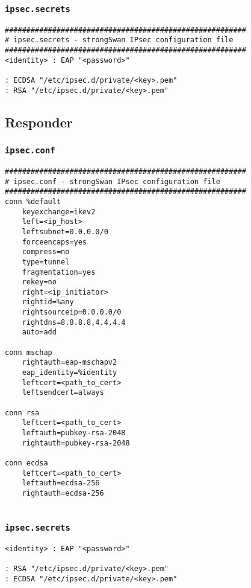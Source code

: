 \documentclass[
10pt, %
a4paper, %
oneside, %
headinclude,footinclude, %
BCOR5mm, %
]{scrartcl}
\begin{document}
\subsubsection*{\lstinline|ipsec.secrets|}
\begin{lstlisting}
########################################################
# ipsec.secrets - strongSwan IPsec configuration file
########################################################
<identity> : EAP "<password>"

: ECDSA "/etc/ipsec.d/private/<key>.pem"
: RSA "/etc/ipsec.d/private/<key>.pem"

\end{lstlisting}

\subsection{Responder}

\subsubsection*{\lstinline|ipsec.conf|}

\begin{lstlisting}
########################################################
# ipsec.conf - strongSwan IPsec configuration file
########################################################
conn %default
    keyexchange=ikev2
    left=<ip_host>
    leftsubnet=0.0.0.0/0
    forceencaps=yes
    compress=no
    type=tunnel
    fragmentation=yes
    rekey=no
    right=<ip_initiator>
    rightid=%any
    rightsourceip=0.0.0.0/0
    rightdns=8.8.8.8,4.4.4.4
    auto=add

conn mschap
    rightauth=eap-mschapv2
    eap_identity=%identity
    leftcert=<path_to_cert>
    leftsendcert=always

conn rsa
    leftcert=<path_to_cert>
    leftauth=pubkey-rsa-2048
    rightauth=pubkey-rsa-2048
    
conn ecdsa
    leftcert=<path_to_cert>
    leftauth=ecdsa-256
    rightauth=ecdsa-256
    
\end{lstlisting}

\subsubsection*{\lstinline|ipsec.secrets|}

\begin{lstlisting}
<identity> : EAP "<password>"

: RSA "/etc/ipsec.d/private/<key>.pem"
: ECDSA "/etc/ipsec.d/private/<key>.pem"


\end{lstlisting}
\end{document}
